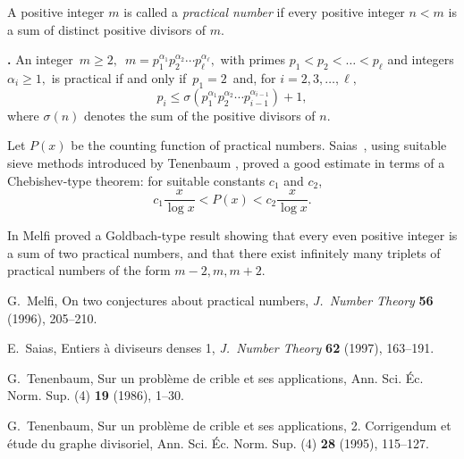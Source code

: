 \documentclass[12pt]{article}
\begin{document}
A positive integer $m$ is called a \emph{practical number} if every positive integer $n<m$ is a sum of distinct positive divisors of $m$. 

{\bf {}.}
An integer $\,m\ge 2,$
$\,m=p_1^{\alpha_1}p_2^{\alpha_2}\cdots p_\ell^{\alpha_\ell},$
with primes $p_1<p_2<\dots<p_\ell$ and integers $\alpha_i\ge 1,$
is practical if and only if $\,p_1=2\,$ and, for
$i=2,3,\dots,\ell,$
$$p_i\le\sigma\!\left(p_1^{\alpha_
1}p_2^{\alpha_2}\cdots p_{i-1}
^{\alpha_{i-1}}\right)+1,$$
where $\sigma(n)$ denotes the sum of the positive divisors of $n.$

Let $P(x)$ be the counting function of practical numbers. 
Saias~\cite{Sai}, using suitable sieve methods introduced by Tenenbaum
\cite{Te1,Te2}, proved
a good estimate in terms of
a Chebishev-type theorem: for suitable
constants $c_1$ and $c_2$,
$$c_1\frac x{\log x}<P(x)<c_2\frac x{\log x}.$$

In \cite{Me1} Melfi proved a Goldbach-type result showing
that every even positive integer is a sum of two practical numbers, and that there exist infinitely many triplets of practical numbers of the form $m-2,m,m+2$.


\begin{thebibliography}{9}


 G.~Melfi, On two conjectures about practical numbers,
{\it J.~Number Theory} {\bf 56} (1996), 205--210.

 E.~Saias, Entiers \`a
diviseurs denses 1, {\it J.~Number Theory} {\bf 62} (1997), 163--191. 

 G.~Tenenbaum, Sur un probl\`eme de crible et ses applications, 
Ann. Sci.
\'Ec. Norm. Sup. (4) {\bf 19 } (1986), 1--30.

 G.~Tenenbaum, Sur un probl\`eme de crible et ses 
applications, 2.
Corrigendum et \'etude du graphe divisoriel, Ann. Sci. \'Ec. Norm. Sup.
(4) {\bf 28 } (1995), 115--127.

\end{thebibliography}
\end{document}
